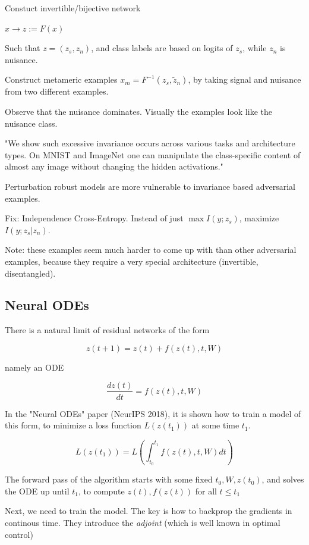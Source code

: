 \documentclass[english]{article}
\begin{document}
Constuct invertible/bijective network 

$x\to z:=F(x)$

Such that $z=(z_s,z_n)$, and class labels are based on logits of $z_s$, while $z_n$ is nuisance. 

Construct metameric examples $x_m = F^{-1}(z_s,\tilde z_n)$, by taking signal and nuisance from two different examples. 

Observe that the nuisance dominates. Visually the examples look like the nuisance class.

"We show such excessive invariance occurs across various
tasks and architecture types. On MNIST and ImageNet one can manipulate the
class-specific content of almost any image without changing the hidden activations."

Perturbation robust models are more vulnerable to invariance based adversarial examples.

Fix: Independence Cross-Entropy. Instead of just $\max I(y;z_s)$, maximize $I(y;z_s|z_n)$.

Note: these examples seem much harder to come up with than other adversarial examples, because they require a very special architecture (invertible, disentangled). 

\eitem 


\subsection{Neural ODEs}
%
\bitem
\item There is a natural limit of residual networks of the form 

$$z(t+1) = z(t) + f(z(t),t,W)$$

namely an ODE

$$\frac{dz(t)}{dt} = f(z(t),t,W)$$

\item In the "Neural ODEs" paper (NeurIPS 2018), it is shown how to train a model of this form, to minimize a loss function $L(z(t_1))$ at some time $t_1$.

$$L(z(t_1)) = L(\int_{t_0}^{t_1} f(z(t),t,W)dt)$$

\item The forward pass of the algorithm starts with some fixed $t_0,W,z(t_0)$, and solves the ODE up until $t_1$, to compute $z(t), f(z(t))$ for all $t\le t_1$

\item Next, we need to train the model. The key is how to backprop the gradients in continous time. They introduce the \emph{adjoint} (which is well known in optimal control)
\end{document}
